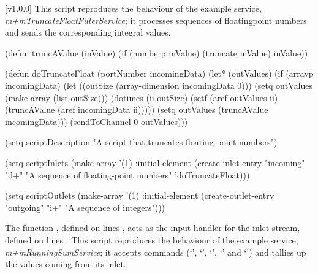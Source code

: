 [v1.0.0]
This script reproduces the behaviour of the example service,
\emph{m+mTruncateFloatFilterService}; it processes sequences of floating\longDash{}point
numbers and sends the corresponding integral values.
\codeBegin
\begin{listing}[5]{1}
(defun truncAValue (inValue)
  (if (numberp inValue) (truncate inValue) inValue))
  
(defun doTruncateFloat (portNumber incomingData)
  (let* (outValues)
    (if (arrayp incomingData)
	(let ((outSize (array-dimension incomingData 0)))
	  (setq outValues (make-array (list outSize)))
	  (dotimes (ii outSize)
	    (setf (aref outValues ii) (truncAValue (aref incomingData ii)))))
      (setq outValues (truncAValue incomingData)))
    (sendToChannel 0 outValues)))

(setq scriptDescription "A script that truncates floating-point numbers")

(setq scriptInlets (make-array '(1) :initial-element
			       (create-inlet-entry "incoming" "d+"
						   "A sequence of floating-point numbers"
						   'doTruncateFloat)))

(setq scriptOutlets (make-array '(1) :initial-element
				(create-outlet-entry "outgoing" "i+"
						     "A sequence of integers")))
\end{listing}
\codeEnd{}
The function , defined on lines \longDash{},
acts as the input handler for the inlet stream, defined on lines
\longDash{}.
\secondaryEnd
\condPage
{}
This script reproduces the behaviour of the example service,
\emph{m+mRunningSumService}; it accepts commands (`',
`', `', `' and
`') and tallies up the values coming from its inlet.
\codeBegin
